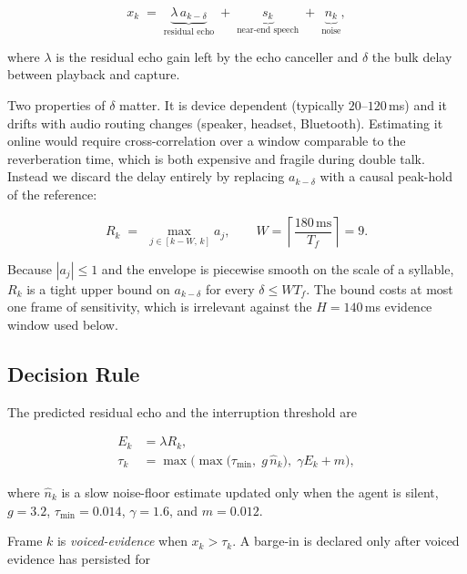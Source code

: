 \begin{equation}
  x_k \;=\; \underbrace{\lambda\, a_{k-\delta}}_{\text{residual echo}}
        \;+\; \underbrace{s_k}_{\text{near-end speech}}
        \;+\; \underbrace{n_k}_{\text{noise}},
  \label{eq:observation}
\end{equation}

where $\lambda$ is the residual echo gain left by the echo canceller and
$\delta$ the bulk delay between playback and capture.

Two properties of $\delta$ matter. It is device dependent
(typically $20$--$120$\,ms) and it drifts with audio routing changes
(speaker, headset, Bluetooth). Estimating it online would require
cross-correlation over a window comparable to the reverberation time, which is
both expensive and fragile during double talk. Instead we discard the delay
entirely by replacing $a_{k-\delta}$ with a causal peak-hold of the reference:

\begin{equation}
  R_k \;=\; \max_{\,j \in [k-W,\,k]} a_j ,
  \qquad W = \left\lceil \frac{180\,\text{ms}}{T_f} \right\rceil = 9 .
  \label{eq:peakhold}
\end{equation}

Because $|a_j| \le 1$ and the envelope is piecewise smooth on the scale of a
syllable, $R_k$ is a tight upper bound on $a_{k-\delta}$ for every
$\delta \le W T_f$. The bound costs at most one frame of sensitivity, which is
irrelevant against the $H=140$\,ms evidence window used below.

\subsection{Decision Rule}

The predicted residual echo and the interruption threshold are

\begin{align}
  E_k &= \lambda R_k, \label{eq:echo}\\
  \tau_k &= \max\Big( \max\big(\tau_{\min},\; g\, \hat n_k\big),\;
             \gamma E_k + m \Big), \label{eq:threshold}
\end{align}

where $\hat n_k$ is a slow noise-floor estimate updated only when the agent is
silent, $g = 3.2$, $\tau_{\min} = 0.014$, $\gamma = 1.6$, and
$m = 0.012$.

Frame $k$ is \emph{voiced-evidence} when $x_k > \tau_k$. A barge-in is declared
only after voiced evidence has persisted for

